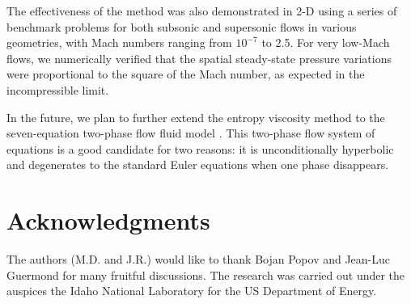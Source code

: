 \documentclass[review,10pt]{elsarticle}
\begin{document}
The effectiveness of the method was also demonstrated in 2-D using a series of benchmark problems
for both subsonic and supersonic flows in various geometries, with Mach numbers ranging from $10^{-7}$ to 
2.5. For very low-Mach flows, we numerically verified that the spatial steady-state pressure variations were proportional to 
the square of the Mach number, as expected in the incompressible limit.

In the future, we plan to further extend the entropy viscosity method to the seven-equation two-phase flow fluid model \cite{SEM}. 
This two-phase flow system of equations is a good candidate for two reasons: it is unconditionally hyperbolic and degenerates to the standard Euler equations when one phase disappears.


\section*{Acknowledgments} 
The authors (M.D. and J.R.) would like to thank Bojan Popov and Jean-Luc Guermond for many fruitful discussions.  
The research was carried out under the auspices the Idaho National Laboratory for the US Department of Energy.


\newpage
\appendix

\end{document}
